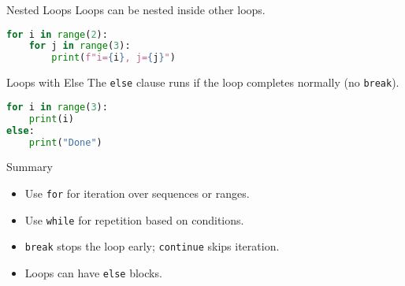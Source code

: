 \begin{frame}[fragile]{Nested Loops}
Loops can be nested inside other loops.

\begin{lstlisting}[language=Python]
for i in range(2):
    for j in range(3):
        print(f"i={i}, j={j}")
\end{lstlisting}
\end{frame}

\begin{frame}[fragile]{Loops with Else}
The \texttt{else} clause runs if the loop completes normally (no \texttt{break}).

\begin{lstlisting}[language=Python]
for i in range(3):
    print(i)
else:
    print("Done")
\end{lstlisting}
\end{frame}

\begin{frame}{Summary}
\begin{itemize}
    \item Use \texttt{for} for iteration over sequences or ranges.
    \item Use \texttt{while} for repetition based on conditions.
    \item \texttt{break} stops the loop early; \texttt{continue} skips iteration.
    \item Loops can have \texttt{else} blocks.
\end{itemize}
\end{frame}

